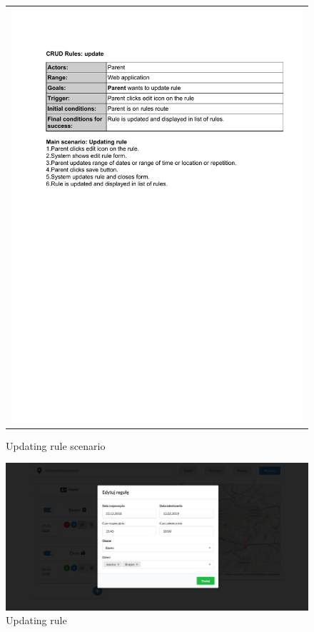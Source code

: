 \documentclass{sprawozdanie-agh}
\begin{document}
    	\begin{figure}[H]
    		\centering
    		\begin{tabular}{c}
    			\includegraphics[width=.80\textwidth]{upR_cropped}
    		\end{tabular}
    		\caption{Updating rule scenario}
    	\end{figure}

    	\begin{figure}[H]
    		\centering
    		\includegraphics[width=.80\textwidth]{editRule}
    		\caption{Updating rule}
    	\end{figure}
\end{document}

